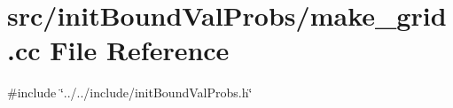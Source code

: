 \section{src/init\+Bound\+Val\+Probs/make\+\_\+grid.cc File Reference}
\label{make__grid_8cc}
{\ttfamily \#include \char`\"{}../../include/init\+Bound\+Val\+Probs.\+h\char`\"{}}\newline
